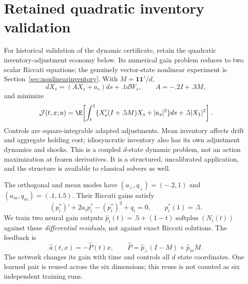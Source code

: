 \section{Retained quadratic inventory validation}\label{sec:inventory}
For historical validation of the dynamic certificate, retain the quadratic inventory-adjustment economy below. Its numerical gain problem reduces to two scalar Riccati equations; the genuinely vector-state nonlinear experiment is Section~\ref{sec:nonlinearinventory}. With $M=\mathbf1\mathbf1'/d$,
\begin{equation}
 dX_s=(AX_s+a_s)ds+.1dW_s,\qquad A=-.2I+.3M,\label{eq:inventorydynamics}
\end{equation}
and minimize
\begin{equation}
 \mathcal J(t,x;a)=\E\!\left[\int_t^1\{X_s'(I+.5M)X_s+|a_s|^2\}ds+.5|X_1|^2\right].
 \label{eq:inventorycriterion}
\end{equation}
Controls are square-integrable adapted adjustments. Mean inventory affects drift and aggregate holding cost; idiosyncratic inventory also has its own adjustment dynamics and shocks. This is a coupled $d$-state dynamic problem, not an action maximization at frozen derivatives. It is a structured, uncalibrated application, and the structure is available to classical solvers as well.

The orthogonal and mean modes have $(a_\perp,q_\perp)=(-.2,1)$ and $(a_m,q_m)=(.1,1.5)$. Their Riccati gains satisfy
\[
 (p_i^*)'+2a_i p_i^*-(p_i^*)^2+q_i=0,\qquad p_i^*(1)=.5.
\]
We train two neural gain outputs $\widehat p_i(t)=.5+(1-t)\operatorname{softplus}(N_i(t))$ against these \emph{differential residuals}, not against exact Riccati solutions. The feedback is
\[
 \widehat a(t,x)=-\widehat P(t)x,\qquad
 \widehat P=\widehat p_\perp(I-M)+\widehat p_mM.
\]
The network changes its gain with time and controls all $d$ state coordinates. One learned pair is reused across the six dimensions; this reuse is not counted as six independent training runs.

